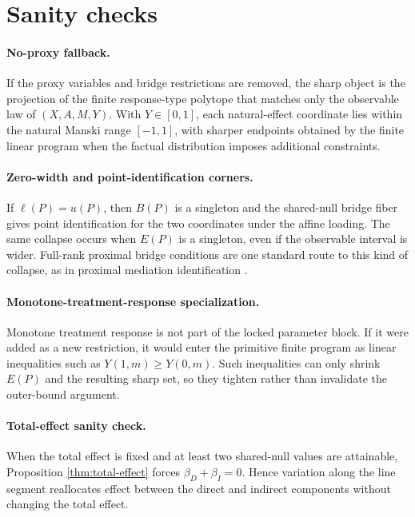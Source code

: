 \documentclass[11pt]{article}
\theoremstyle{definition}
\theoremstyle{plain}
\theoremstyle{remark}
\begin{document}
\section{Sanity checks}
\paragraph{No-proxy fallback.}
If the proxy variables and bridge restrictions are removed, the sharp object is
the projection of the finite response-type polytope that matches only the
observable law of \((X,A,M,Y)\).  With \(Y\in[0,1]\), each natural-effect
coordinate lies within the natural Manski range \([-1,1]\), with sharper
endpoints obtained by the finite linear program when the factual distribution
imposes additional constraints.

\paragraph{Zero-width and point-identification corners.}
If \(\ell(P)=u(P)\), then \(B(P)\) is a singleton and the shared-null bridge
fiber gives point identification for the two coordinates under the affine
loading.  The same collapse occurs when \(E(P)\) is a singleton, even if the
observable interval is wider.  Full-rank proximal bridge conditions are one
standard route to this kind of collapse, as in proximal mediation
identification \cite{DukesShpitserTchetgen2023}.

\paragraph{Monotone-treatment-response specialization.}
Monotone treatment response is not part of the locked parameter block.  If it
were added as a new restriction, it would enter the primitive finite program as
linear inequalities such as \(Y(1,m)\ge Y(0,m)\).  Such inequalities can only
shrink \(E(P)\) and the resulting sharp set, so they tighten rather than
invalidate the outer-bound argument.

\paragraph{Total-effect sanity check.}
When the total effect is fixed and at least two shared-null values are
attainable, Proposition \ref{thm:total-effect} forces
\(\beta_D+\beta_I=0\).  Hence variation along the line segment reallocates
effect between the direct and indirect components without changing the total
effect.
\end{document}
